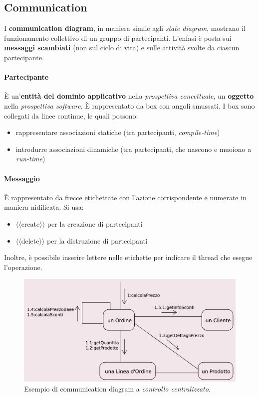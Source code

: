 \subsection{Communication}

I \textbf{communication diagram}, in maniera simile agli \textit{state diagram}, mostrano il funzionamento collettivo di un gruppo di partecipanti. L'enfasi è posta sui \textbf{messaggi scambiati} (non sul ciclo di vita) e sulle attività svolte da ciascun partecipante.

\paragraph{Partecipante} È un'\textbf{entità del dominio applicativo} nella \textit{prospettiva concettuale}, un \textbf{oggetto} nella \textit{prospettiva software}. È rappresentato da box con angoli smussati. I box sono collegati da linee continue, le quali possono:
\begin{itemize}
    \item rappresentare associazioni statiche (tra partecipanti, \textit{compile-time})
    \item introdurre associazioni dinamiche (tra partecipanti, che nascono e muoiono a \textit{run-time})
\end{itemize}

\paragraph{Messaggio} È rappresentato da frecce etichettate con l'azione corrispondente e numerate in maniera nidificata. Si usa:
\begin{itemize}
    \item $\langle\langle$create$\rangle\rangle$ per la creazione di partecipanti
    \item $\langle\langle$delete$\rangle\rangle$ per la distruzione di partecipanti
\end{itemize}
Inoltre, è possibile inserire lettere nelle etichette per indicare il thread che esegue l'operazione.

\begin{figure}[H]
    \centering
    \includegraphics[width=1\linewidth]{assets/UML/communication/communication-1.png}
    \caption{Esempio di communication diagram a \textit{controllo centralizzato}.}
\end{figure}

\newpage